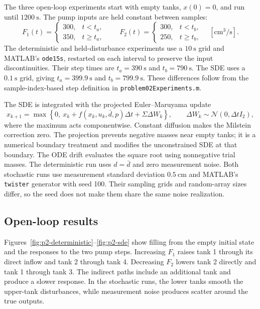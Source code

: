 The three open-loop experiments start with empty tanks, $x(0)=0$, and run
until $1200\ \mathrm{s}$. The pump inputs are held constant between samples:
\begin{equation}
 F_1(t)=\begin{cases}300,&t<t_a,\\350,&t\geq t_a,\end{cases}
 \qquad
 F_2(t)=\begin{cases}300,&t<t_b,\\250,&t\geq t_b,\end{cases}
 \quad [\mathrm{cm^3/s}].
\end{equation}
The deterministic and held-disturbance experiments use a $10\ \mathrm{s}$
grid and MATLAB's \texttt{ode15s}, restarted on each interval to preserve
the input discontinuities. Their step times are $t_a=390\ \mathrm{s}$ and
$t_b=790\ \mathrm{s}$. The SDE uses a $0.1\ \mathrm{s}$ grid, giving
$t_a=399.9\ \mathrm{s}$ and $t_b=799.9\ \mathrm{s}$. These differences
follow from the sample-index-based step definition in
\texttt{problem02Experiments.m}.

The SDE is integrated with the projected Euler--Maruyama update
\begin{equation}
 x_{k+1}=\max\left\{0,\ x_k+f(x_k,u_k,\bar d,p)\Delta t
                    +\Sigma\Delta W_k\right\},\qquad
 \Delta W_k\sim\mathcal N(0,\Delta t I_2),
\end{equation}
where the maximum acts componentwise. Constant diffusion makes the
Milstein correction zero. The projection prevents negative masses near
empty tanks; it is a numerical boundary treatment and modifies the
unconstrained SDE at that boundary. The ODE drift evaluates the square root
using nonnegative trial masses. The deterministic run uses $d=\bar d$ and
zero measurement noise. Both stochastic runs use measurement standard
deviation $0.5\ \mathrm{cm}$ and MATLAB's \texttt{twister} generator with
seed 100. Their sampling grids and random-array sizes differ, so the seed
does not make them share the same noise realization.

\subsection{Open-loop results}

Figures~\ref{fig:p2-deterministic}--\ref{fig:p2-sde} show filling from the
empty initial state and the responses to the two pump steps. Increasing
$F_1$ raises tank 1 through its direct inflow and tank 2 through tank 4.
Decreasing $F_2$ lowers tank 2 directly and tank 1 through tank 3.
The indirect paths include an additional tank and produce a slower response.
In the stochastic runs, the lower tanks smooth the upper-tank disturbances,
while measurement noise produces scatter around the true outputs.

